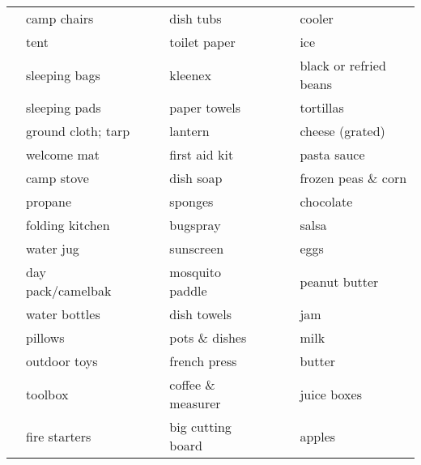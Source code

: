 \documentclass[10pt]{article}
\newcommand{\mybox}{\framebox[4mm]{\textcolor{white} m} \framebox[4mm]{\textcolor{white} m} }
\begin{document}
\pagestyle{empty}



\renewcommand{\arraystretch}{1.5}

\begin{tabular}{rlcrlcrl} \hline
\mybox & camp chairs   &\hspace{13mm}&\mybox & dish tubs     &\hspace{13mm}&\mybox & cooler \\
\mybox & tent                   &    &\mybox & toilet paper         &      &\mybox & ice \\
\mybox & sleeping bags          &    &\mybox & kleenex              &      &\mybox & black or refried beans \\
\mybox & sleeping pads          &    &\mybox & paper towels         &      &\mybox & tortillas \\
\mybox & ground cloth; tarp     &    &\mybox & lantern              &      &\mybox & cheese (grated) \\
\mybox & welcome mat            &    &\mybox & first aid kit        &      &\mybox & pasta sauce \\
\mybox & camp stove             &    &\mybox & dish soap            &      &\mybox & frozen peas \& corn \\
\mybox & propane                &    &\mybox & sponges              &      &\mybox & chocolate \\
\mybox & folding kitchen        &    &\mybox & bugspray             &      &\mybox & salsa \\
\mybox & water jug              &    &\mybox & sunscreen            &      &\mybox & eggs \\
\mybox & day pack/camelbak      &    &\mybox & mosquito paddle      &      &\mybox & peanut butter \\ \cline{4-5}
\mybox & water bottles          &    &\mybox & dish towels          &      &\mybox & jam \\
\mybox & pillows                &    &\mybox & pots \& dishes       &      &\mybox & milk \\
\mybox & outdoor toys           &    &\mybox & french press         &      &\mybox & butter \\ \cline{1-2}
\mybox & toolbox                &    &\mybox & coffee \& measurer   &      &\mybox & juice boxes \\
\mybox & fire starters          &    &\mybox & big cutting board    &      &\mybox & apples \\

\end{tabular}
\end{document}
